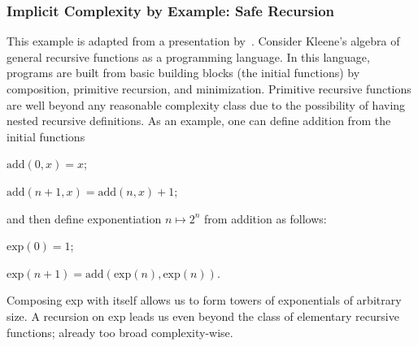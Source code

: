 \subsubsection{Implicit Complexity by Example: Safe Recursion}
\label{safe-rec}

This example is adapted from a presentation by~\textcite{dallago2022}.
Consider Kleene's algebra of general recursive functions as a programming language.
In this language, programs are built from basic building blocks (the initial functions) by %
composition, primitive recursion, and minimization.
Primitive recursive functions are
well beyond any reasonable complexity class
due to the possibility of having nested recursive definitions.
As an example, one can define addition from the initial functions

\begin{center}
    \(\text{add}(0, x) = x\);

    \(\text{add}(n + 1, x) = \text{add}(n, x) + 1\);
\end{center}

and then define exponentiation \(n \mapsto 2^n\) from addition as follows:

\begin{center}
    \(\text{exp}(0) = 1\);

    \(\text{exp}(n + 1) = \text{add}(\text{exp}(n), \text{exp}(n))\).
\end{center}

\noindent Composing exp with itself allows us to form towers of exponentials of arbitrary size. %
A recursion on exp leads us even beyond the class of elementary recursive functions; %
already too broad complexity-wise.

